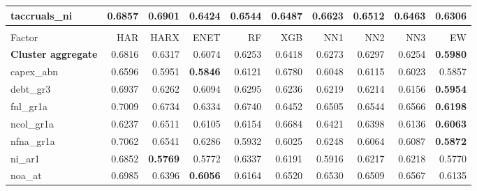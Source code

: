 \begin{longtable}{>{\raggedright\arraybackslash}p{2.6cm}rrrrrrrrr}
taccruals\_ni & 0.6857 & 0.6901 & \cellcolor{blue!10}0.6424 & \cellcolor{blue!10}0.6544 & \cellcolor{blue!10}0.6487 & \cellcolor{blue!10}0.6623 & \cellcolor{blue!10}0.6512 & \cellcolor{blue!10}0.6463 & \textbf{\cellcolor{blue!10}0.6306} \\
\hline
\multicolumn{10}{@{}l}{\textit{Panel B. Debt Issuance}} \\
\hline
Factor & HAR & HARX & ENET & RF & XGB & NN1 & NN2 & NN3 & EW \\
\hline
\textbf{Cluster aggregate} & 0.6816 & \cellcolor{blue!10}0.6317 & \cellcolor{blue!10}0.6074 & \cellcolor{blue!10}0.6253 & \cellcolor{blue!10}0.6418 & \cellcolor{blue!10}0.6273 & \cellcolor{blue!10}0.6297 & \cellcolor{blue!10}0.6254 & \textbf{\cellcolor{blue!10}0.5980} \\
capex\_abn & 0.6596 & \cellcolor{blue!10}0.5951 & \textbf{\cellcolor{blue!10}0.5846} & \cellcolor{blue!10}0.6121 & 0.6780 & \cellcolor{blue!10}0.6048 & \cellcolor{blue!10}0.6115 & \cellcolor{blue!10}0.6023 & \cellcolor{blue!10}0.5857 \\
debt\_gr3 & 0.6937 & \cellcolor{blue!10}0.6262 & \cellcolor{blue!10}0.6094 & \cellcolor{blue!10}0.6295 & \cellcolor{blue!10}0.6236 & \cellcolor{blue!10}0.6219 & \cellcolor{blue!10}0.6214 & \cellcolor{blue!10}0.6156 & \textbf{\cellcolor{blue!10}0.5954} \\
fnl\_gr1a & 0.7009 & \cellcolor{blue!10}0.6734 & \cellcolor{blue!10}0.6334 & \cellcolor{blue!10}0.6740 & \cellcolor{blue!10}0.6452 & \cellcolor{blue!10}0.6505 & \cellcolor{blue!10}0.6544 & \cellcolor{blue!10}0.6566 & \textbf{\cellcolor{blue!10}0.6198} \\
ncol\_gr1a & 0.6237 & 0.6511 & \cellcolor{blue!10}0.6105 & \cellcolor{blue!10}0.6154 & 0.6684 & 0.6421 & 0.6398 & \cellcolor{blue!10}0.6136 & \textbf{\cellcolor{blue!10}0.6063} \\
nfna\_gr1a & 0.7062 & \cellcolor{blue!10}0.6541 & \cellcolor{blue!10}0.6286 & \cellcolor{blue!10}0.5932 & \cellcolor{blue!10}0.6025 & \cellcolor{blue!10}0.6248 & \cellcolor{blue!10}0.6064 & \cellcolor{blue!10}0.6087 & \textbf{\cellcolor{blue!10}0.5872} \\
ni\_ar1 & 0.6852 & \textbf{\cellcolor{blue!10}0.5769} & \cellcolor{blue!10}0.5772 & \cellcolor{blue!10}0.6337 & \cellcolor{blue!10}0.6191 & \cellcolor{blue!10}0.5916 & \cellcolor{blue!10}0.6217 & \cellcolor{blue!10}0.6218 & \cellcolor{blue!10}0.5770 \\
noa\_at & 0.6985 & \cellcolor{blue!10}0.6396 & \textbf{\cellcolor{blue!10}0.6056} & \cellcolor{blue!10}0.6164 & \cellcolor{blue!10}0.6520 & \cellcolor{blue!10}0.6530 & \cellcolor{blue!10}0.6509 & \cellcolor{blue!10}0.6567 & \cellcolor{blue!10}0.6135 \\

\end{longtable}
